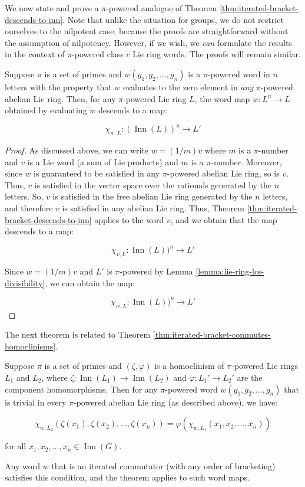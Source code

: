 We now state and prove a $\pi$-powered analogue of Theorem
\ref{thm:iterated-bracket-descends-to-inn}. Note that unlike the
situation for groups, we do not restrict ourselves to the nilpotent
case, because the proofs are straightforward without the assumption of
nilpotency. However, if we wish, we {\em can} formulate the results in
the context of $\pi$-powered class $c$ Lie ring words. The proofs will
remain similar.

\begin{theorem}\label{thm:iterated-bracket-descends-to-inn-pi-powered}
  Suppose $\pi$ is a set of primes and $w(g_1,g_2,\dots,g_n)$ is a
  $\pi$-powered word in $n$ letters with the property that $w$
  evaluates to the zero element in {\em any} $\pi$-powered abelian Lie
  ring. Then, for any $\pi$-powered Lie ring $L$, the word map $w:L^n
  \to L$ obtained by evaluating $w$ descends to a map:

  $$\chi_{w,L}: (\operatorname{Inn}(L))^n  \to L'$$
\end{theorem}

\begin{proof}
  As discussed above, we can write $w = (1/m)v$ where $m$ is a
  $\pi$-number and $v$ is a Lie word (a sum of Lie products) and $m$
  is a $\pi$-number. Moreover, since $w$ is guaranteed to be satisfied
  in any $\pi$-powered abelian Lie ring, so is $v$. Thus, $v$ is
  satisfied in the vector space over the rationals generated by the
  $n$ letters. So, $v$ is satisfied in the free abelian Lie ring
  generated by the $n$ letters, and therefore $v$ is satisfied in any
  abelian Lie ring. Thus, Theorem
  \ref{thm:iterated-bracket-descends-to-inn} applies to the word
  $v$, and we obtain that the map descends to a map:

  $$\chi_{v,L}: \operatorname{Inn}(L))^n \to L'$$

  Since $w = (1/m)v$ and $L'$ is $\pi$-powered by Lemma
  \ref{lemma:lie-ring-lcs-divisibility}, we can obtain the map:

  $$\chi_{w,L}: \operatorname{Inn}(L))^n \to L'$$
\end{proof}

The next theorem is related to Theorem \ref{thm:iterated-bracket-commutes-homoclinisms}.

\begin{theorem}\label{thm:iterated-bracket-commutes-homoclinisms-pi-powered}
  Suppose $\pi$ is a set of primes and $(\zeta,\varphi)$ is a
  homoclinism of $\pi$-powered Lie rings $L_1$ and $L_2$, where
  $\zeta:\operatorname{Inn}(L_1) \to \operatorname{Inn}(L_2)$ and
  $\varphi:L_1' \to L_2'$ are the component homomorphisms. Then for
  any $\pi$-powered word $w(g_1,g_2,\dots,g_n)$ that is trivial
  in every $\pi$-powered abelian Lie ring (as described above), we have:

  $$\chi_{w,L_2}(\zeta(x_1),\zeta(x_2),\dots,\zeta(x_n)) = \varphi(\chi_{w,L_1}(x_1,x_2,\dots,x_n))$$

  for all $x_1,x_2,\dots,x_n \in \operatorname{Inn}(G)$.

  Any word $w$ that is an iterated commutator (with any order of
  bracketing) satisfies this condition, and the theorem applies to
  such word maps.
\end{theorem}

